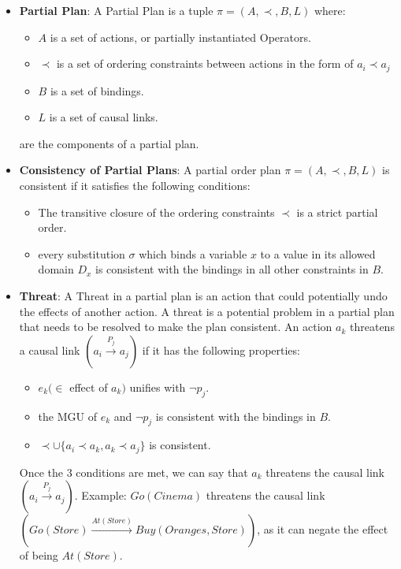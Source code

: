 \begin{itemize}
      \item  \label{def:partial_plan}
            \textbf{Partial Plan}: A Partial Plan is a tuple $\pi = (A, \prec, B, L)$ where:
            \begin{itemize}
                  \item $A$ is a set of actions, or partially instantiated Operators.
                  \item $\prec$ is a set of ordering constraints between actions in the form of $a_i \prec a_j$
                  \item $B$ is a set of bindings.
                  \item $L$ is a set of causal links.
            \end{itemize}
            are the components of a partial plan.


      \item  \label{def:consistency_partial_plan}
            \textbf{Consistency of Partial Plans}: A partial order plan $\pi = (A, \prec, B, L)$ is consistent if it satisfies the following conditions:
            \begin{itemize}
                  \item The transitive closure of the ordering constraints $\prec$ is a strict partial order.
                  \item every substitution $\sigma $ which binds a variable $x$ to a value in its allowed domain $D_x$ is consistent with the bindings in all other constraints in $B$.
            \end{itemize}


      \item  \label{def:threat}
            \textbf{Threat}: A Threat in a partial plan is an action that could potentially undo the effects of another action. A threat is a potential problem in a partial plan that needs to be resolved to make the plan consistent. An action $a_k$ threatens a causal link $(a_i \xrightarrow{\text{$P_j$}}  a_j)$ if it has the following properties:
            \begin{itemize}
                  \item $e_k (\in$ effect of $a_k)$ unifies with $\lnot p_j$.
                  \item the \ac{MGU} of $e_k$ and $\lnot p_j$ is consistent with the bindings in $B$.
                  \item $\prec \cup \{a_i \prec a_k, a_k \prec a_j\}$ is consistent.
            \end{itemize}
            Once the 3 conditions are met, we can say that $a_k$ threatens the causal link $(a_i \xrightarrow{\text{$P_j$}}  a_j)$.
            Example: $Go(Cinema)$ threatens the causal link $(Go(Store) \xrightarrow{\text{$At(Store)$}} Buy(Oranges,Store))$, as it can negate the effect of being $At(Store)$.


\end{itemize}
